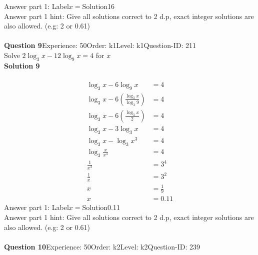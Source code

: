 \documentclass{article}
\begin{document}
Answer part 1: \hspace{10pt}Label\hspace{10pt}$x=$\hspace{10pt}Solution\hspace{10pt}16\\
Answer part 1 hint: \hspace{15pt}Give all solutions correct to 2 d.p, exact integer solutions are also allowed. (e.g: 2 or 0.61)\\
\\[4pt]
\noindent\textbf{Question 9}\hspace{20pt}Experience: 50\hspace{20pt}Order: k1\hspace{20pt}Level: k1\hspace{20pt}Question-ID: 211\\[2pt]
Solve $2\log_{3}x-12\log_{9}x=4$ for $x$\\[4pt]
\noindent\textbf{Solution 9}\\[2pt]
\\[-35pt]\begin{align*}
\log_{3}x-6\log_{9}x&=4\\[2pt]
\log_{3}x-6\left(\displaystyle\frac{\log_{3}x}{\log_{3}9}\right)&=4\\[2pt]
\log_{3}x-6\left(\displaystyle\frac{\log_{3}x}{2}\right)&=4\\[2pt]
\log_{3}x-3\log_{3}x&=4\\[2pt]
\log_{3}x-\log_{3}x^3&=4\\[2pt]
\log_{3}\displaystyle\frac{x}{x^3}&=4\\[2pt]
\displaystyle\frac{1}{x^2}&=3^4\\[2pt]
\displaystyle\frac{1}{x}&=3^2\\[2pt]
x&=\displaystyle\frac{1}{9}\\[2pt]
x&=0.11
\end{align*}
Answer part 1: \hspace{10pt}Label\hspace{10pt}$x=$\hspace{10pt}Solution\hspace{10pt}0.11\\
Answer part 1 hint: \hspace{15pt}Give all solutions correct to 2 d.p, exact integer solutions are also allowed. (e.g: 2 or 0.61)\\
\\[4pt]
\noindent\textbf{Question 10}\hspace{20pt}Experience: 50\hspace{20pt}Order: k2\hspace{20pt}Level: k2\hspace{20pt}Question-ID: 239\\[2pt]
\end{document}
